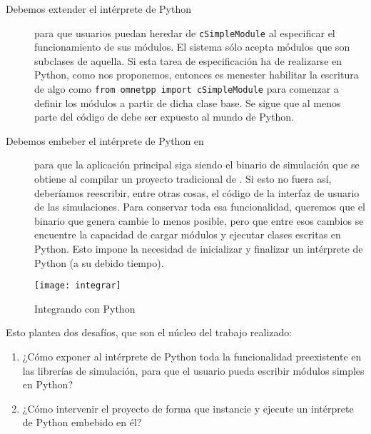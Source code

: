\begin{description}
    \item[Debemos extender el intérprete de Python] para que usuarios puedan heredar de \linebreak
    \verb!cSimpleModule! al especificar el funcionamiento de sus módulos. El
    sistema sólo acepta módulos que son subclases de aquella. Si esta tarea de
    especificación ha de realizarse en Python, como nos proponemos, entonces es
    menester habilitar la escritura de algo como
    \verb!from omnetpp import cSimpleModule!
    para comenzar a definir los módulos a partir de dicha clase base. Se sigue
    que al menos parte del código de \omnetpp{} debe ser expuesto al mundo de
    Python.

    \item[Debemos embeber el intérprete de Python en \omnetpp{}] para que la aplicación \linebreak
    principal siga siendo el binario de simulación que se obtiene al compilar
    un proyecto tradicional de \omnetpp{}. Si esto no fuera así, deberíamos
    reescribir, entre otras cosas, el código de la interfaz de usuario de las
    simulaciones.  Para conservar toda esa funcionalidad, queremos que el
    binario que genera \omnetpp{} cambie lo menos posible, pero que entre esos
    cambios se encuentre la capacidad de cargar módulos y ejecutar clases
    escritas en Python. Esto impone la necesidad de inicializar y finalizar un
    intérprete de Python (a su debido tiempo).
\end{description}

\begin{figure}[h]
\caption{Integrando \omnetpp{} con Python}
\label{fig:integrar}
\centering
\texttt{[image: integrar]}
\end{figure}

Esto plantea dos desafíos, que son el núcleo del trabajo realizado:

\begin{enumerate}
    \item ¿Cómo exponer al intérprete de Python toda la funcionalidad
    preexistente en las librerías de simulación, para que el usuario pueda
    escribir módulos simples en Python?

    \item ¿Cómo intervenir el proyecto \omnetpp{} de forma que instancie y
    ejecute un intérprete de Python embebido en él?
\end{enumerate}

